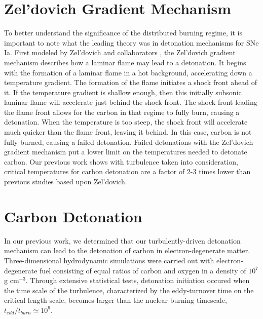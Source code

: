 \documentclass{aastex63}
\begin{document}
\section{Zel'dovich Gradient Mechanism}

To better understand the significance of the distributed burning regime, it is important to note what the leading theory was in detonation mechanisms for SNe Ia. First modeled by Zel'dovich and collaborators \cite{zeldovichetal70}, the Zel'dovich gradient mechanism describes how a laminar flame may lead to a detonation. It begins with the formation of a laminar flame in a hot background, accelerating down a temperature gradient. The formation of the flame initiates a shock front ahead of it. If the temperature gradient is shallow enough, then this initially subsonic laminar flame will accelerate just behind the shock front. The shock front leading the flame front allows for the carbon in that regime to fully burn, causing a detonation. When the temperature is too steep, the shock front will accelerate much quicker than the flame front, leaving it behind. In this case, carbon is not fully burned, causing a failed detonation. Failed detonations with the Zel'dovich gradient mechanism put a lower limit on the temperatures needed to detonate carbon. Our previous work shows with turbulence taken into consideration, critical temperatures for carbon detonation are a factor of 2-3 times lower than previous studies based upon Zel'dovich.

\section{Carbon Detonation}

In our previous work, we determined that our turbulently-driven detonation mechanism can lead to the detonation of carbon in electron-degenerate matter. Three-dimensional hydrodynamic simulations were carried out with electron-degenerate fuel consisting of equal ratios of carbon and oxygen in a density of $10^7$ g cm$^{-3}$. Through extensive statistical tests, detonation initiation occured when the time scale of the turbulence, characterized by the eddy-turnover time on the critical length scale, becomes larger than the nuclear burning timescale, $t_{edd}/t_{burn} \simeq 10^9$.
\end{document}
